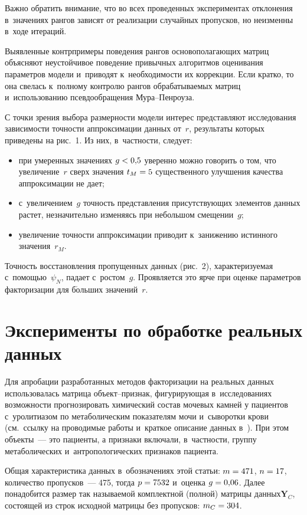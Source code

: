 \begin{multicols}{2}
     
     
     Важно обратить внимание, что во всех проведенных экспериментах 
отклонения в~значениях рангов зависят от реализации случайных пропусков, но 
неизменны в~ходе итераций.
     
     Выявленные контрпримеры поведения рангов основополагающих матриц 
объясняют неустойчивое поведение привычных алгоритмов оценивания 
параметров модели и~приводят к~необходимости их коррекции. Если кратко, то 
она свелась к~полному контролю рангов обрабатываемых матриц 
и~использованию псевдообращения Му\-ра--Пен\-роуза.
     
     С точки зрения выбора размерности модели интерес представляют 
исследования зависимости точности аппроксимации данных от~$r$, результаты 
которых приведены на рис.~1. Из них, в~частности, следует:
     \begin{itemize}
\item при умеренных значениях $g\hm< 0{,}5$ уверенно можно говорить о том, 
что увеличение~$r$ сверх значения $t_M\hm=5$ существенного улучшения 
качества аппроксимации не дает;
\item с~увеличением~$g$ точность представления присутствующих элементов 
данных растет, незначительно изменяясь при небольшом смещении~$g$; 
\item увеличение точности аппроксимации приводит к~занижению истинного 
значения~$r_M$. 
\end{itemize}

     
     Точность восстановления пропущенных данных (рис.~2), 
характеризуемая с~помощью~$\psi_N$, падает с~ростом~$g$. Проявляется это 
ярче при оценке параметров факторизации для б$\acute{\mbox{о}}$льших 
значений~$r$.
     
\section{Эксперименты по обработке реальных данных}

     Для апробации разработанных методов факторизации на реальных 
данных использовалась мат\-ри\-ца объект--при\-знак, фигурирующая 
в~исследованиях возможности прогнозировать химический состав мочевых 
камней у пациентов с~уролитиазом по метаболическим показателям мочи 
и~сыворотки крови (см.\ ссылку на проводимые работы и~краткое описание 
данных в~\cite{5-kri}). При этом объекты~--- это пациенты, а признаки 
включали, в~частности, группу метаболических и~антропологических признаков 
пациента.
     
     Общая характеристика данных в~обозначениях этой статьи: $m\hm= 471$, 
$n\hm=17$, количество пропусков~--- 475, тогда $p\hm=7532$ и~оценка $g\hm= 
0{,}06$. Далее понадобится размер так называемой комплектной (полной) 
матрицы данных$\mathbf{Y}_C$, состоящей из строк исходной матрицы без 
пропусков: $m_C\hm= 304$.
     

\end{multicols}
